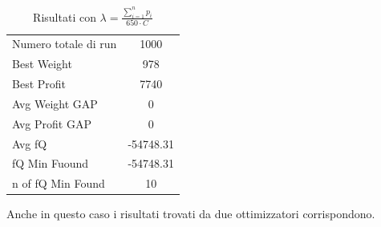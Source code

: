 \documentclass[a4paper,12pt]{article}
\begin{document}
\begin{table}[H]
\centering
\begin{tabular}{lc}
\toprule
Numero totale di run & 1000 \\
Best Weight & 978 \\
Best Profit & 7740 \\
Avg Weight GAP & 0 \\
Avg Profit GAP & 0 \\
Avg fQ & -54748.31 \\
fQ Min Fuound & -54748.31 \\
n of fQ Min Found & 10 \\
\bottomrule
\end{tabular}
\caption{Risultati con $\lambda = \displaystyle \frac{\sum_{i=1}^{n} p_i}{650 \cdot C}$}
\end{table}

Anche in questo caso i risultati trovati da due ottimizzatori corrispondono.
\end{document}
